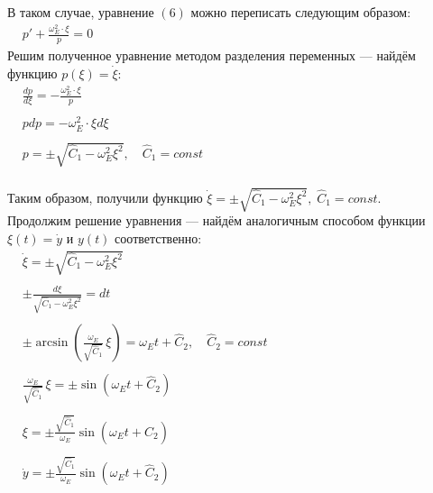 \documentclass[oneside,final,14pt]{extarticle}
\begin{document}
		\noindent В таком случае, уравнение $(6)$ можно переписать следующим образом: \\
		
		\begin{math}
			\begin{aligned}
				& p' + \frac{\omega_{E}^{2} \cdot \xi}{p} = 0
			\end{aligned}
		\end{math} \\
		
		\noindent Решим полученное уравнение методом разделения переменных --- найдём функцию $p(\xi) = \dot{\xi}$: \\
		
		\begin{math}
			\begin{aligned}
				& \frac{dp}{d\xi} = - \frac{\omega_{E}^{2} \cdot \xi}{p} \\\\
				& pdp = - \omega_{E}^{2} \cdot \xi d\xi \\\\
				& p = \pm \sqrt{\widehat{C}_{1} - \omega_{E}^{2} \xi^{2}}, \quad \widehat{C}_{1} = const
			\end{aligned}
		\end{math} \\\\
		
		\noindent Таким образом, получили функцию $\dot{\xi} = \pm \sqrt{\widehat{C}_{1} - \omega_{E}^{2} \xi^{2}},\; \widehat{C}_{1} = const$. \\
		
		\noindent Продолжим решение уравнения --- найдём аналогичным способом функции $\xi(t) = \dot{y}$ и $y(t)$ соответственно: \\
		
		\begin{math}
			\begin{aligned}
				& \dot{\xi} = \pm \sqrt{\widehat{C}_{1} - \omega_{E}^{2} \xi^{2}} \\\\
				& \pm \frac{d\xi}{\sqrt{\widehat{C}_{1} - \omega_{E}^{2} \xi^{2}}} = dt \\\\
				& \pm \arcsin{\left(\frac{\omega_{E}}{\sqrt{\widehat{C}_{1}}}\,\xi\right)} = \omega_{E}t + \widehat{C}_{2}, \quad \widehat{C}_{2} = const  \\\\
				& \frac{\omega_{E}}{\sqrt{\widehat{C}_{1}}}\,\xi = \pm \sin{(\omega_{E}t + \widehat{C}_{2})} \\\\
				& \xi = \pm \frac{\sqrt{\widehat{C}_1}}{\omega_{E}} \sin{(\omega_{E}t + \widehat{C}_{2})} \\\\
				& \dot{y} = \pm \frac{\sqrt{\widehat{C}_1}}{\omega_{E}} \sin{(\omega_{E}t + \widehat{C}_{2})} \\\\
			\end{aligned}
		\end{math}
		
\end{document}
